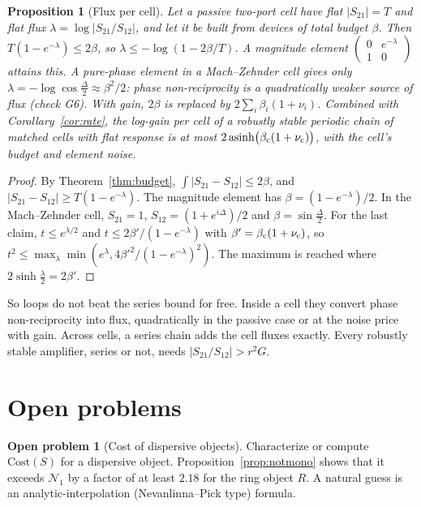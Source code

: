\documentclass[11pt]{article}
\newtheorem{proposition}[theorem]{Proposition}
\theoremstyle{definition}
\newtheorem{problem}{Open problem}
\theoremstyle{remark}
\newcommand{\NN}{\mathcal N_1}
\begin{document}
\begin{proposition}[Flux per cell]\label{prop:fluxcell}
Let a passive two-port cell have flat $|S_{21}|=T$ and flat flux $\lambda=\log|S_{21}/S_{12}|$, and let it be built from devices of total budget $\beta$. Then $T(1-e^{-\lambda})\le2\beta$, so $\lambda\le-\log(1-2\beta/T)$. A magnitude element $\left(\begin{smallmatrix}0&e^{-\lambda}\\1&0\end{smallmatrix}\right)$ attains this. A pure-phase element in a Mach--Zehnder cell gives only $\lambda=-\log\cos\frac\Delta2\approx\beta^2/2$: phase non-reciprocity is a quadratically weaker source of flux (check G6). With gain, $2\beta$ is replaced by $2\sum_i\beta_i(1+\nu_i)$. Combined with Corollary~\ref{cor:rate}, the log-gain per cell of a robustly stable periodic chain of matched cells with flat response is at most $2\,\mathrm{asinh}\bigl(\beta_{\rm c}(1+\nu_{\rm c})\bigr)$, with the cell's budget and element noise.
\end{proposition}
\begin{proof}
By Theorem~\ref{thm:budget}, $\int|S_{21}-S_{12}|\le2\beta$, and $|S_{21}-S_{12}|\ge T(1-e^{-\lambda})$. The magnitude element has $\beta=(1-e^{-\lambda})/2$. In the Mach--Zehnder cell, $S_{21}=1$, $S_{12}=(1+e^{i\Delta})/2$ and $\beta=\sin\frac\Delta2$. For the last claim, $t\le e^{\lambda/2}$ and $t\le2\beta'/(1-e^{-\lambda})$ with $\beta'=\beta_{\rm c}(1+\nu_{\rm c})$, so $t^2\le\max_\lambda\min(e^\lambda,4\beta'^2/(1-e^{-\lambda})^2)$. The maximum is reached where $2\sinh\frac\lambda2=2\beta'$.
\end{proof}

So loops do not beat the series bound for free. Inside a cell they convert phase non-reciprocity into flux, quadratically in the passive case or at the noise price with gain. Across cells, a series chain adds the cell fluxes exactly. Every robustly stable amplifier, series or not, needs $|S_{21}/S_{12}|>r^2G$.

\section{Open problems}\label{sec:open}

\begin{problem}[Cost of dispersive objects]
Characterize or compute $\mathrm{Cost}(S)$ for a dispersive object. Proposition~\ref{prop:notmono} shows that it exceeds $\NN$ by a factor of at least $2.18$ for the ring object $R$. A natural guess is an analytic-interpolation (Nevanlinna--Pick type) formula.
\end{problem}
\end{document}
